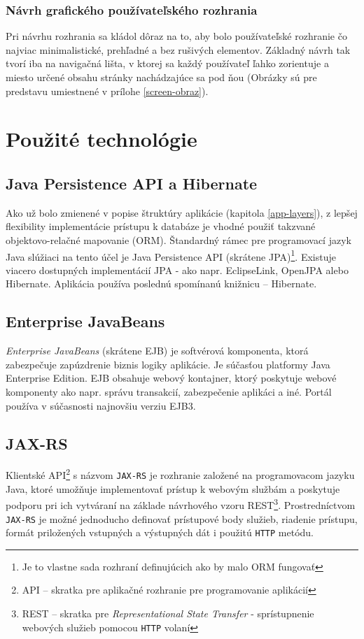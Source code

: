 \documentclass[12pt,oneside]{fithesis2}
\begin{document}
      		\subsubsection{Návrh grafického používateľského rozhrania}
      \par Pri návrhu rozhrania sa kládol dôraz na to, aby bolo používateľské rozhranie čo najviac minimalistické, prehľadné a bez rušivých elementov. Základný návrh tak tvorí iba na navigačná lišta, v ktorej sa každý používateľ ľahko zorientuje a miesto určené obsahu stránky nachádzajúce sa pod ňou (Obrázky sú pre predstavu umiestnené v prílohe \ref{screen-obraz}).
      
      \pagebreak
      \section{Použité technológie}
     		
      	\subsection{Java Persistence API a Hibernate}
	\par Ako už bolo zmienené v popise štruktúry aplikácie (kapitola \ref{app-layers}), z lepšej flexibility implementácie prístupu k databáze je vhodné použiť takzvané objektovo-relačné mapovanie (ORM). Štandardný rámec pre programovací jazyk Java slúžiaci na tento účel je Java Persistence API (skrátene JPA)\footnote{Je to vlastne sada rozhraní definujúcich ako by malo ORM fungovať}. Existuje viacero dostupných implementácií JPA - ako napr. EclipseLink, OpenJPA alebo Hibernate. Aplikácia používa poslednú spomínanú knižnicu -- Hibernate.
      
		\subsection{Enterprise JavaBeans}
	\par \textit{Enterprise JavaBeans} (skrátene EJB) je softvérová komponenta, ktorá zabezpečuje zapúzdrenie biznis logiky aplikácie. Je súčasťou platformy Java Enterprise Edition. EJB obsahuje webový kontajner, ktorý poskytuje webové komponenty ako napr. správu transakcií, zabezpečenie aplikáci a iné. Portál používa v súčasnosti najnovšiu verziu EJB3.
	
		\subsection{JAX-RS}
	\par Klientské API\footnote{API -- skratka pre aplikačné rozhranie pre programovanie aplikácií} s názvom \texttt{JAX-RS} je rozhranie založené na programovacom jazyku Java, ktoré umožňuje implementovať prístup k webovým službám a poskytuje podporu pri ich vytváraní na základe návrhového vzoru REST\cite{oracle15}\footnote{REST -- skratka pre \textit{Representational State Transfer} - sprístupnenie webových služieb pomocou \texttt{HTTP} volaní}. Prostredníctvom \texttt{JAX-RS} je možné jednoducho definovať prístupové body služieb, riadenie prístupu, formát priložených vstupných a výstupných dát i použitú \texttt{HTTP} metódu.
	
\end{document}
